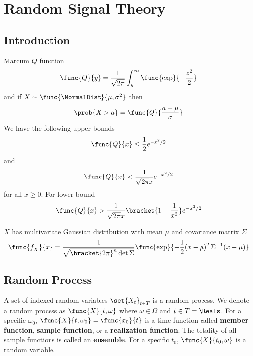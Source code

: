 \chapter{Random Signal Theory}
\section{Introduction}
Marcum \(Q\) function 
\begin{equation*}
    \func{Q}{y} = \dfrac{1}{\sqrt{2\pi}} \int_{y}^{\infty} \func{\exp}{-\dfrac{z^2}{2}}
\end{equation*}
and if \(X \sim \func{\NormalDist}{\mu, \sigma^2}\) then 
\begin{equation*}
    \prob{X > a} = \func{Q}{\dfrac{a - \mu}{\sigma}}
\end{equation*}
We have the following upper bounds 
\begin{equation*}
    \func{Q}{x} \leq \dfrac{1}{2}e^{-x^2/2}
\end{equation*}
and 
\begin{equation*}
    \func{Q}{x} < \dfrac{1}{\sqrt{2\pi} x}e^{-x^2 / 2}
\end{equation*}
for all \(x \geq 0\). For lower bound 
\begin{equation*}
    \func{Q}{x} > \dfrac{1}{\sqrt{2 \pi} x} \bracket{1 - \dfrac{1}{x^2}}e^{-x^2 / 2}
\end{equation*}

\(\bar{X}\) has multivariate Gaussian distribution with mean \(\mu\) and covariance matrix \(\Sigma\)
\begin{equation*}
    \func{f_{\bar{X}}}{\bar{x}} = \dfrac{1}{\sqrt{\bracket{2\pi}^n \det \Sigma}} \func{\exp}{- \dfrac{1}{2} (\bar{x} - \mu)^T \Sigma^{-1} (\bar{x} - \mu)}
\end{equation*}

\section{Random Process}
A set of indexed random variables \(\set{X_t}_{t \in T}\) is a random process. We denote a random process as \(\func{X}{t,\omega}\) where \(\omega \in \Omega\) and \(t \in T = \Reals\).  For a specific \(\omega_0\), \(\func{X}{t,\omega_0} = \func{x_0}{t}\) is a time function called \textbf{member function}, \textbf{sample function}, or a \textbf{realization function}. The totality of all sample functions is called an \textbf{ensemble}. For a specific \(t_0\), \(\func{X}{t_0,\omega}\) is a random variable.

